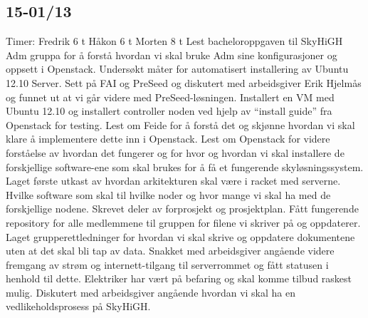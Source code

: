 \documentclass[12pt,a4paper]{article}
\begin{document}
\subsection{15-01/13}
Timer: \newline
Fredrik 	6 t \newline
Håkon 		6 t \newline
Morten 	8 t \newline
\newline
Lest bacheloroppgaven til SkyHiGH Adm gruppa for å forstå hvordan vi skal bruke Adm sine konfigurasjoner og oppsett i Openstack. Undersøkt måter for automatisert installering av Ubuntu 12.10 Server. Sett på FAI og PreSeed og diskutert med arbeidsgiver Erik Hjelmås og funnet ut at vi går videre med PreSeed-løsningen. Installert en VM med Ubuntu 12.10 og installert controller noden ved hjelp av “install guide” fra Openstack for testing.\newline
\newline
Lest om Feide for å forstå det og skjønne hvordan vi skal klare å implementere dette inn i Openstack. Lest om Openstack for videre forståelse av hvordan det fungerer og for hvor og hvordan vi skal installere de forskjellige software-ene som skal brukes for å få et fungerende skyløsningssystem.\newline
\newline
Laget første utkast av hvordan arkitekturen skal være i racket med serverne. Hvilke software som skal til hvilke noder og hvor mange vi skal ha med de forskjellige nodene. Skrevet deler av forprosjekt og prosjektplan. Fått fungerende repository for alle medlemmene til gruppen for filene vi skriver på og oppdaterer. Laget grupperettledninger for hvordan vi skal skrive og oppdatere dokumentene uten at det skal bli tap av data.\newline
\newline
Snakket med arbeidsgiver angående videre fremgang av strøm og internett-tilgang til serverrommet og fått statusen i henhold til dette. Elektriker har vært på befaring og skal komme tilbud raskest mulig. Diskutert med arbeidsgiver angående hvordan vi skal ha en vedlikeholdsprosess på SkyHiGH.\newline
\newline
\end{document}
